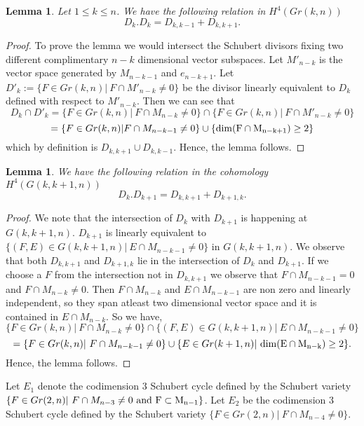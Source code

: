 \documentclass[a4paper,11pt]{amsart}
\newtheorem{lemma}[theorem]{Lemma}
\begin{document}
\begin{lemma}\label{lm41} Let $1\leq k \leq n$. We have the following relation in $H^4(Gr(k,n))$ 
\[D_{k}.D_{k} = D_{k,k-1} + D_{k,k+1}.\]
\end{lemma}
\begin{proof} To prove the lemma we would intersect the Schubert divisors fixing two different complimentary $n-k$ dimensional vector subspaces. Let $M'_{n-k}$ is the vector space generated by $M_{n-k-1}$ and $e_{n-k+1}$. Let $D'_k := \{ F \in Gr(k,n) | ~F \cap M'_{n-k} \neq 0 \} $ be the divisor linearly equivalent to $D_k$ defined with respect to $M'_{n-k}$. Then we can see that 
\[ D_k \cap D'_k = \{ F\in Gr(k,n) | ~F \cap M_{n-k} \neq 0\} \cap \{F \in Gr(k,n)|~ F\cap M'_{n-k} \neq 0\}
\]
\[ =\{F\in Gr(k,n) | F\cap M_{n-k-1} \neq 0 \} \cup \{\rm{dim}(F \cap M_{n-k+1}) \geq 2\}
\]
which by definition is $D_{k,k+1} \cup D_{k,k-1}$. Hence, the lemma follows.
\end{proof}

\begin{lemma}\label{lm42} We have the following relation in the cohomology $H^4(G(k,k+1,n))$ 
\[D_{k}.D_{k+1} = D_{k,k+1} + D_{k+1,k}.\]
\end{lemma}
\begin{proof} We note that the intersection of $D_{k}$ with $D_{k+1}$ is happening at $G(k,k+1,n)$. $D_{k+1}$ is linearly equivalent to $\{ (F,E) \in G(k,k+1,n) | ~ E \cap M_{n-k-1} \neq 0\}$ in $G(k,k+1,n)$. We observe that both $D_{k,k+1}$ and $D_{k+1,k}$ lie in the intersection of $D_{k}$ and $D_{k+1}$. If we choose a $F$ from the intersection not in $D_{k,k+1}$ we observe that $F \cap M_{n-k-1} = 0$ and $F\cap M_{n-k} \neq 0$. Then $F \cap M_{n-k}$ and $E\cap M_{n-k-1}$ are non zero and linearly independent, so they span atleast two dimensional vector space and it is contained in $E \cap M_{n-k}$. So we have, 
 \[ \{ F \in Gr(k,n) |~F\cap M_{n-k} \neq 0 \} \cap \{ (F,E) \in G(k,k+1,n) | ~ E \cap M_{n-k-1} \neq 0\}\]
\[ = \{F \in Gr(k,n) |~F \cap M_{n-k-1} \neq 0 \} \cup \{ E\in Gr(k+1,n) |~\rm{dim} (E \cap M_{n-k}) \geq 2\}.  
\] 
Hence, the lemma follows.
\end{proof}

Let $E_1$ denote the codimension $3$ Schubert cycle defined by the Schubert variety  $\{F\in Gr(2,n) |~F \cap M_{n-3} \neq 0 ~\rm{and} ~F \subset M_{n-1}\}$. Let $E_2$ be the codimension $3$ Schubert cycle defined by the Schubert variety $\{F\in Gr(2,n) |~F \cap M_{n-4} \neq 0 \}$. 
\end{document}
